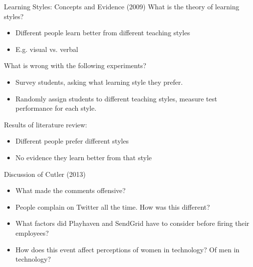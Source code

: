 \documentclass{beamer}
\begin{document}
\begin{frame}{Learning Styles: Concepts and Evidence (2009)}
What is the theory of learning styles?
\pause
\begin{itemize}
\item Different people learn better from different teaching styles
\item E.g. visual vs. verbal
\end{itemize}
\pause
\bigskip
What is wrong with the following experiments?
\begin{itemize}
\item Survey students, asking what learning style they prefer.
\pause
\item Randomly assign students to different teaching styles, measure test performance for each style.
\end{itemize}
\pause
\bigskip
Results of literature review:
\begin{itemize}
\item Different people prefer different styles
\item No evidence they learn better from that style
\end{itemize}
\end{frame}

\begin{frame}{Discussion of Cutler (2013)}
\begin{itemize}
\item What made the comments offensive?
\bigskip
\item People complain on Twitter all the time. How was this different?
\bigskip
\item What factors did Playhaven and SendGrid have to consider before firing their employees?
\bigskip
\item How does this event affect perceptions of women in technology? Of men in technology?
\end{itemize}
\end{frame}
\end{document}
